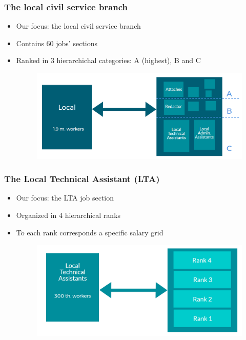 \documentclass[xcolor=table,ignorenonframetext,12pt]{beamer}
\begin{document}
\begin{frame}
\frametitle{The local civil service branch}
\begin{itemize}
	\item Our focus: the local civil service branch\\
	\item Contains 60 jobs' sections\\
	\item Ranked in 3 hierarchichal categories: A (highest), B and C\\
	\vspace{-0.1cm}
	\begin{center}
		\begin{figure}
			\includegraphics[width=.95\textwidth]{Graphiques/corps_fpt.png}
		\end{figure}
	\end{center}
\end{itemize}
\end{frame}

\begin{frame}
\frametitle{The Local Technical Assistant (LTA)}
\begin{itemize}
	\item Our focus: the LTA job section\\
	\item Organized in 4 hierarchical ranks
	\item To each rank corresponds a specific salary grid
	\vspace{-0.05cm}
	\begin{center}
		\begin{figure}
			\includegraphics[width=.85\textwidth]{Graphiques/ATT_grades.png}
		\end{figure}
	\end{center}
\end{itemize}
\end{frame}
\end{document}
